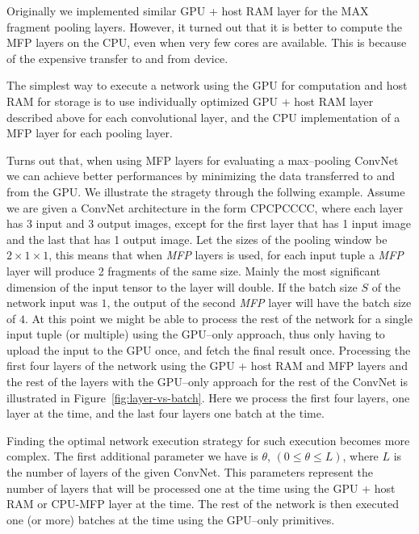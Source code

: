 \documentclass[conference]{./IEEEtran/IEEEtran}
\begin{document}
  Originally we implemented similar GPU + host RAM layer for the MAX
  fragment pooling layers.  However, it turned out that it is better
  to compute the MFP layers on the CPU, even when very few cores are
  available. This is because of the expensive transfer to and from
  device.

  The simplest way to execute a network using the GPU for computation
  and host RAM for storage is to use individually optimized GPU + host
  RAM layer described above for each convolutional layer, and the CPU
  implementation of a MFP layer for each pooling layer.

  Turns out that, when using MFP layers for evaluating a max--pooling
  ConvNet we can achieve better performances by minimizing the data
  transferred to and from the GPU.  We illustrate the stragety through
  the follwing example.  Assume we are given a ConvNet architecture in
  the form CPCPCCCC, where each layer has 3 input and 3 output
  images, except for the first layer that has 1 input
  image and the last that has 1 output image.  Let the
  sizes of the pooling window be $2 \times 1 \times 1$, this means
  that when \emph{MFP} layers is used, for each input tuple a
  \emph{MFP} layer will produce 2 fragments of the same size.  Mainly
  the most significant dimension of the input tensor to the layer will
  double.  If the batch size $S$ of the network input was $1$, the
  output of the second \emph{MFP} layer will have the batch size of
  $4$.  At this point we might be able to process the rest of the
  network for a single input tuple (or multiple) using the GPU--only
  approach, thus only having to upload the input to the GPU once, and
  fetch the final result once.  Processing the first four layers of
  the network using the GPU + host RAM and MFP layers and the rest of
  the layers with the GPU--only approach for the rest of the ConvNet
  is illustrated in Figure~\ref{fig:layer-vs-batch}.  Here we process
  the first four layers, one layer at the time, and the last four
  layers one batch at the time.

  Finding the optimal network execution strategy for such execution
  becomes more complex.  The first additional parameter we have is
  $\theta$, $(0 \le \theta \le L)$, where $L$ is the number of layers
  of the given ConvNet.  This parameters represent the number of
  layers that will be processed one at the time using the GPU + host
  RAM or CPU-MFP layer at the time.  The rest of the network is then
  executed one (or more) batches at the time using the GPU--only
  primitives.
\end{document}

